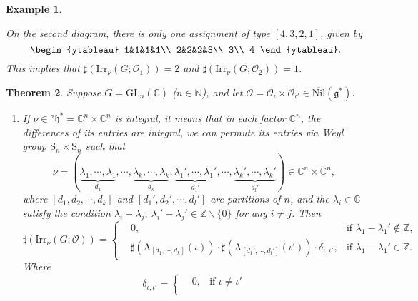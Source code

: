 \documentclass[12pt, a4paper]{amsart}
\numberwithin{equation}{section}
\newtheorem{thm}{Theorem}[section]
\newtheorem{examp}[thm]{Example}
\newcommand{\BC}{{\mathbb {C}}}
\newcommand{\BN}{{\mathbb {N}}}
\newcommand{\BZ}{{\mathbb {Z}}}
\newcommand{\CO}{{\mathcal {O}}}
\newcommand{\fg}{\mathfrak{g}}
\newcommand{\fh}{\mathfrak{h}}
\newcommand{\GL}{{\mathrm{GL}}}
\newcommand{\A}{{\mathrm{A}}}
\newcommand{\Irr}{{\mathrm{Irr}}}
\newcommand{\Nil}{{\mathrm{Nil}}}
\renewcommand{\bar}{\overline}
\begin{document}
\begin{examp}
\begin{enumerate}
            On the second diagram, there is only one assignment of type $[4,3,2,1]$, given by
            \[
                \begin{ytableau}
                    1&1&1&1\\
                    2&2&2&3\\
                    3\\
                    4
                \end{ytableau}.
            \]
            This implies that $\sharp(\Irr_{\nu}(G;\CO_1)) = 2$ and $\sharp(\Irr_{\nu}(G;\CO_2)) = 1$.
    \end{enumerate}
\end{examp}


\begin{thm}\label{C}
    Suppose $G = \GL_{n}(\BC)$ ($n \in \BN$), and let $\CO = \CO_{\iota} \times \CO_{\iota'} \in \bar{\Nil}(\fg^*)$.
    \begin{enumerate}
        \item If $\nu \in {^a\fh^*} = \BC^n \times \BC^n$ is integral, it means that in each factor $\BC^n$, the differences of its entries are integral, we can permute its entries via Weyl group $\mathrm{S}_n \times \mathrm{S}_n$ such that
        \[
        \nu =  (\underbrace{\lambda_1, \cdots, \lambda_1}_{d_1}, \cdots, \underbrace{\lambda_k, \cdots, \lambda_k}_{d_k}, \underbrace{\lambda_1', \cdots, \lambda_1'}_{d_1'}, \cdots, \underbrace{\lambda_k', \cdots, \lambda_k'}_{d_{l}'} ) \in \BC^n \times \BC^n, 
        \]
        where $[d_1,d_2,\cdots,d_k]$ and $[d_1',d_2',\cdots,d_l']$ are partitions of $n$, and the $\lambda_i \in \BC$ satisfy the condition $\lambda_i - \lambda_j, \ \lambda_i' - \lambda_j' \in \BZ \backslash \{0\}$ for any $i \neq j$. Then
        \begin{equation}
            \sharp(\Irr_{\nu}(G;\CO)) = \left\{ 
            \begin{aligned}
                &0, & \textrm{if $\lambda_1 - \lambda_1' \notin \BZ$},\\
                &\sharp(\A_{[d_1,\cdots,d_k]}(\iota)) \cdot \sharp(\A_{[d_1',\cdots,d_l']}(\iota')) \cdot \delta_{\iota,\iota'} , & \textrm{if $\lambda_1 - \lambda_1' \in \BZ$}.
            \end{aligned}
            \right.
        \end{equation}
        Where $$\delta_{\iota,\iota'} = \left\{
        \begin{aligned}
            &0, & \textrm{if $\iota \neq  \iota'$}\\

\end{aligned}$$
\end{enumerate}
\end{thm}
\end{document}

